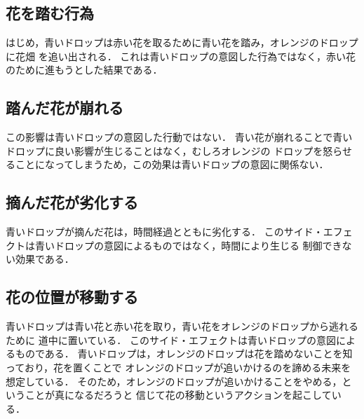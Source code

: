 \documentclass[a4]{jsarticle}
\begin{document}
\subsection{花を踏む行為}
はじめ，青いドロップは赤い花を取るために青い花を踏み，オレンジのドロップに花畑
を追い出される．
これは青いドロップの意図した行為ではなく，赤い花のために進もうとした結果である．

\subsection{踏んだ花が崩れる}
この影響は青いドロップの意図した行動ではない．
青い花が崩れることで青いドロップに良い影響が生じることはなく，むしろオレンジの
ドロップを怒らせることになってしまうため，この効果は青いドロップの意図に関係ない．

\subsection{摘んだ花が劣化する}
青いドロップが摘んだ花は，時間経過とともに劣化する．
このサイド・エフェクトは青いドロップの意図によるものではなく，時間により生じる
制御できない効果である．

\subsection{花の位置が移動する}
青いドロップは青い花と赤い花を取り，青い花をオレンジのドロップから逃れるために
道中に置いている．
このサイド・エフェクトは青いドロップの意図によるものである．
青いドロップは，オレンジのドロップは花を踏めないことを知っており，花を置くことで
オレンジのドロップが追いかけるのを諦める未来を想定している．
そのため，オレンジのドロップが追いかけることをやめる，ということが真になるだろうと
信じて花の移動というアクションを起こしている．
\end{document}
